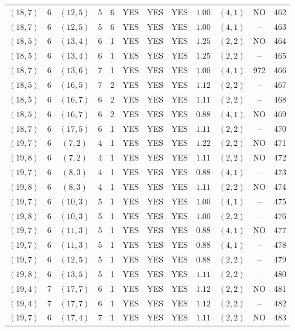 \begin{longtable}{|c|c|c|c|c|c|c|c|c|c|c|c|}
$(18,7)$ & 6 & $(12,5)$ & 5 & 6 & YES & YES & YES & $1.00$ & $(4,1)$ & NO & 462\\
$(18,7)$ & 6 & $(12,5)$ & 5 & 6 & YES & YES & YES & $1.00$ & $(4,1)$ & -- & 463\\
$(18,5)$ & 6 & $(13,4)$ & 6 & 1 & YES & YES & YES & $1.25$ & $(2,2)$ & NO & 464\\
$(18,5)$ & 6 & $(13,4)$ & 6 & 1 & YES & YES & YES & $1.25$ & $(2,2)$ & -- & 465\\
$(18,7)$ & 6 & $(13,6)$ & 7 & 1 & YES & YES & YES & $1.00$ & $(4,1)$ & 972 & 466\\
$(18,5)$ & 6 & $(16,5)$ & 7 & 2 & YES & YES & YES & $1.12$ & $(2,2)$ & -- & 467\\
$(18,5)$ & 6 & $(16,7)$ & 6 & 2 & YES & YES & YES & $1.11$ & $(2,2)$ & -- & 468\\
$(18,5)$ & 6 & $(16,7)$ & 6 & 2 & YES & YES & YES & $0.88$ & $(4,1)$ & NO & 469\\
$(18,7)$ & 6 & $(17,5)$ & 6 & 1 & YES & YES & YES & $1.11$ & $(2,2)$ & -- & 470\\
$(19,7)$ & 6 & $(7,2)$ & 4 & 1 & YES & YES & YES & $1.22$ & $(2,2)$ & NO & 471\\
$(19,8)$ & 6 & $(7,2)$ & 4 & 1 & YES & YES & YES & $1.11$ & $(2,2)$ & NO & 472\\
$(19,7)$ & 6 & $(8,3)$ & 4 & 1 & YES & YES & YES & $0.88$ & $(4,1)$ & -- & 473\\
$(19,8)$ & 6 & $(8,3)$ & 4 & 1 & YES & YES & YES & $1.11$ & $(2,2)$ & NO & 474\\
$(19,7)$ & 6 & $(10,3)$ & 5 & 1 & YES & YES & YES & $1.00$ & $(4,1)$ & -- & 475\\
$(19,8)$ & 6 & $(10,3)$ & 5 & 1 & YES & YES & YES & $1.00$ & $(2,2)$ & -- & 476\\
$(19,7)$ & 6 & $(11,3)$ & 5 & 1 & YES & YES & YES & $0.88$ & $(4,1)$ & NO & 477\\
$(19,7)$ & 6 & $(11,3)$ & 5 & 1 & YES & YES & YES & $0.88$ & $(4,1)$ & -- & 478\\
$(19,7)$ & 6 & $(12,5)$ & 5 & 1 & YES & YES & YES & $0.88$ & $(2,2)$ & -- & 479\\
$(19,8)$ & 6 & $(13,5)$ & 5 & 1 & YES & YES & YES & $1.11$ & $(2,2)$ & -- & 480\\
$(19,4)$ & 7 & $(17,7)$ & 6 & 1 & YES & YES & YES & $1.12$ & $(2,2)$ & NO & 481\\
$(19,4)$ & 7 & $(17,7)$ & 6 & 1 & YES & YES & YES & $1.12$ & $(2,2)$ & -- & 482\\
$(19,7)$ & 6 & $(17,4)$ & 7 & 1 & YES & YES & YES & $1.11$ & $(2,2)$ & NO & 483\\

\end{longtable}
